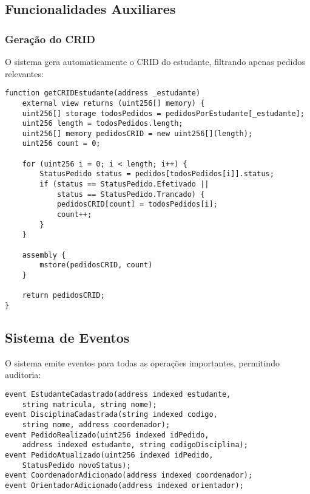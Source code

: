 \documentclass[12pt,a4paper]{article}
\begin{document}
\subsection{Funcionalidades Auxiliares}

\subsubsection{Geração do CRID}

O sistema gera automaticamente o CRID do estudante, filtrando apenas pedidos relevantes:

\begin{lstlisting}[caption=Geração do CRID]
function getCRIDEstudante(address _estudante) 
    external view returns (uint256[] memory) {
    uint256[] storage todosPedidos = pedidosPorEstudante[_estudante];
    uint256 length = todosPedidos.length;
    uint256[] memory pedidosCRID = new uint256[](length);
    uint256 count = 0;
    
    for (uint256 i = 0; i < length; i++) {
        StatusPedido status = pedidos[todosPedidos[i]].status;
        if (status == StatusPedido.Efetivado || 
            status == StatusPedido.Trancado) {
            pedidosCRID[count] = todosPedidos[i];
            count++;
        }
    }
    
    assembly {
        mstore(pedidosCRID, count)
    }
    
    return pedidosCRID;
}
\end{lstlisting}

\subsection{Sistema de Eventos}

O sistema emite eventos para todas as operações importantes, permitindo auditoria:

\begin{lstlisting}[caption=Eventos do Sistema]
event EstudanteCadastrado(address indexed estudante, 
    string matricula, string nome);
event DisciplinaCadastrada(string indexed codigo, 
    string nome, address coordenador);
event PedidoRealizado(uint256 indexed idPedido, 
    address indexed estudante, string codigoDisciplina);
event PedidoAtualizado(uint256 indexed idPedido, 
    StatusPedido novoStatus);
event CoordenadorAdicionado(address indexed coordenador);
event OrientadorAdicionado(address indexed orientador);
\end{lstlisting}
\end{document}
